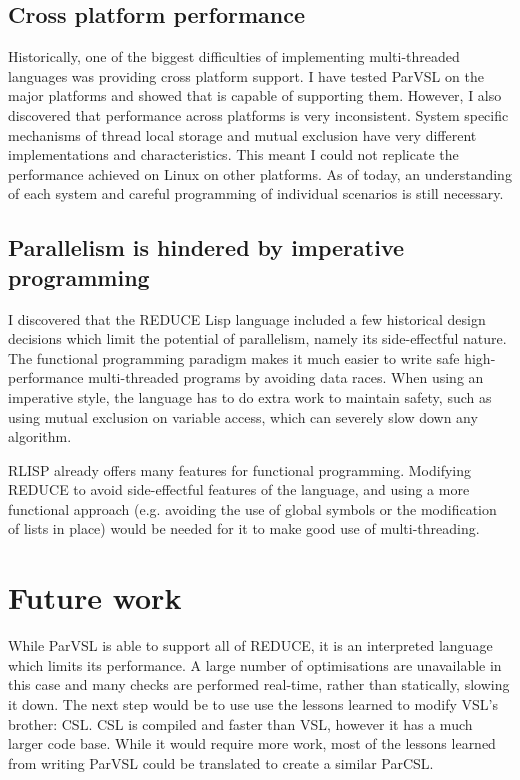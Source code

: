 \subsection{Cross platform performance}

Historically, one of the biggest difficulties of implementing multi-threaded languages
was providing cross platform support. I have tested ParVSL on the major platforms and
showed that is capable of supporting them. However, I also discovered that performance
across platforms is very inconsistent. System specific mechanisms of thread local storage
and mutual exclusion have very different implementations and characteristics. This meant
I could not replicate the performance achieved on Linux on other platforms. As of today,
an understanding of each system and careful programming of individual scenarios is still
necessary.

\subsection{Parallelism is hindered by imperative programming}

I discovered that the REDUCE Lisp language included a few historical design decisions which
limit the potential of parallelism, namely its side-effectful nature. The functional programming
paradigm makes it much easier to write safe high-performance multi-threaded programs by avoiding
data races. When using an imperative style, the language has to do extra work to maintain safety,
such as using mutual exclusion on variable access, which can severely slow down any algorithm.

RLISP already offers many features for functional programming.
Modifying REDUCE to avoid side-effectful features of the language, and using a more
functional approach (e.g. avoiding the use of global symbols or the modification
of lists in place) would be needed for it to make good use of multi-threading.

\section{Future work}

While ParVSL is able to support all of REDUCE, it is an interpreted language
which limits its performance. A large number of optimisations are unavailable in this
case and many checks are performed real-time, rather than statically, slowing it down.
The next step would be to use use the lessons learned to modify VSL's brother: CSL.
CSL is compiled and faster than VSL, however it has a much larger code base.
While it would require more work, most of the lessons learned from writing ParVSL could be translated
to create a similar ParCSL.

